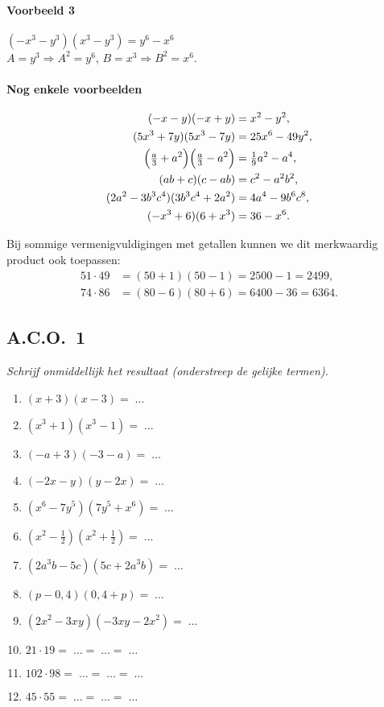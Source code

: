\documentclass[a4paper,12pt]{article}
\begin{document}
\paragraph*{Voorbeeld 3}
\(({-}x^3-y^3)(x^3-y^3)=y^6-x^6\)\\
\(A=y^3\Rightarrow A^2=y^6\), \quad \(B=x^3\Rightarrow B^2=x^6\).

\paragraph*{Nog enkele voorbeelden}
\[
\begin{aligned}
({-}x-y)({-}x+y) &= x^2-y^2,\\
(5x^3+7y)(5x^3-7y) &= 25x^6-49y^2,\\
\Bigl(\tfrac{a}{3}+a^2\Bigr)\Bigl(\tfrac{a}{3}-a^2\Bigr) &= \tfrac{1}{9}a^2-a^4,\\
(ab+c)(c-ab) &= c^2-a^2b^2,\\
(2a^2-3b^3c^4)(3b^3c^4+2a^2) &= 4a^4-9b^6c^8,\\
({-}x^3+6)(6+x^3) &= 36-x^6.
\end{aligned}
\]

Bij sommige vermenigvuldigingen met getallen kunnen we dit merkwaardig product ook toepassen:
\[
\begin{aligned}
51\cdot 49 &= (50+1)(50-1)=2500-1=2499,\\
74\cdot 86 &= (80-6)(80+6)=6400-36=6364.
\end{aligned}
\]

\subsection*{A.C.O.\ 1}
\emph{Schrijf onmiddellijk het resultaat (onderstreep de gelijke termen).}
\begin{multicols}{2}
  \begin{enumerate}
  \item \((x+3)(x-3)=\;\ldots\)
  \item \((x^3+1)(x^3-1)=\;\ldots\)
  \item \(({-}a+3)({-}3-a)=\;\ldots\)
  \item \(({-}2x-y)(y-2x)=\;\ldots\)
  \item \((x^6-7y^5)(7y^5+x^6)=\;\ldots\)
  \item \((x^2-\tfrac{1}{2})(x^2+\tfrac{1}{2})=\;\ldots\)
  \item \((2a^3b-5c)(5c+2a^3b)=\;\ldots\)
  \item \((p-0{,}4)(0{,}4+p)=\;\ldots\)
  \item \((2x^2-3xy)({-}3xy-2x^2)=\;\ldots\)
  \item \(21\cdot 19=\;\ldots=\;\ldots=\;\ldots\)
  \item \(102\cdot 98=\;\ldots=\;\ldots=\;\ldots\)
  \item \(45\cdot 55=\;\ldots=\;\ldots=\;\ldots\)
  \end{enumerate}
\end{multicols}
\end{document}
